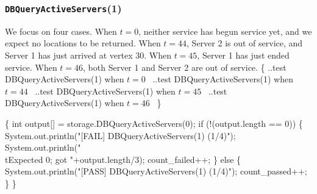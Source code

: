 \documentclass{article}
\def\nwendcode{\endtrivlist \endgroup}
\let\nwdocspar=\par
\begin{document}
\subsubsection{{\tt{}DBQueryActiveServers}(1)}
We focus on four cases. When $t=0$, neither service has begun service yet,
and we expect no locations to be returned. When $t=44$, Server 2 is out of
service, and Server 1 has just arrived at vertex 30. When $t=45$, Server 1
has just ended service. When $t=46$, both Server 1 and Server 2 are out of
service.
\nwenddocs{}\endmoddef{}
\{
  \LA{}..test \code{}DBQueryActiveServers\edoc{}(1) when $t=0$~{\nwtagstyle{}}\RA{}
  \LA{}..test \code{}DBQueryActiveServers\edoc{}(1) when $t=44$~{\nwtagstyle{}}\RA{}
  \LA{}..test \code{}DBQueryActiveServers\edoc{}(1) when $t=45$~{\nwtagstyle{}}\RA{}
  \LA{}..test \code{}DBQueryActiveServers\edoc{}(1) when $t=46$~{\nwtagstyle{}}\RA{}
\}
\nwendcode{}\nwdocspar
\nwenddocs{}\endmoddef{}
\{
  int output[] = storage.DBQueryActiveServers(0);
  if (!(output.length == 0)) \{
    System.out.println("[FAIL] DBQueryActiveServers(1) (1/4)");
    System.out.println("\\tExpected 0; got "+output.length/3);
    count_failed++;
  \} else \{
    System.out.println("[PASS] DBQueryActiveServers(1) (1/4)");
    count_passed++;
  \}
\}
\nwendcode{}\nwdocspar
\nwenddocs{}\endmoddef{}
\end{document}
